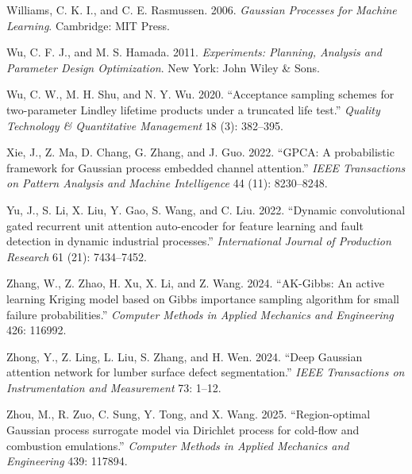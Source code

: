 \documentclass[]{interact}
\theoremstyle{plain}%
\theoremstyle{definition}
\theoremstyle{remark}
\begin{document}
\begin{thebibliography}{}
Williams, C. K. I., and C. E. Rasmussen. 2006. \emph{Gaussian Processes for Machine Learning}. Cambridge: MIT Press.

Wu, C. F. J., and M. S. Hamada. 2011. \emph{Experiments: Planning, Analysis and Parameter Design Optimization}. New York: John Wiley \& Sons.

Wu, C. W., M. H. Shu, and N. Y. Wu. 2020. ``Acceptance sampling schemes for two-parameter Lindley lifetime products under a truncated life test.'' \emph{Quality Technology \& Quantitative Management} 18 (3): 382--395.



Xie, J., Z. Ma, D. Chang, G. Zhang, and J. Guo. 2022. ``GPCA: A probabilistic framework for Gaussian process embedded channel attention.'' \emph{IEEE Transactions on Pattern Analysis and Machine Intelligence} 44 (11): 8230--8248.


Yu, J., S. Li, X. Liu, Y. Gao, S. Wang, and C. Liu. 2022. ``Dynamic convolutional gated recurrent unit attention auto-encoder for feature learning and fault detection in dynamic industrial processes.'' \emph{International Journal of Production Research} 61 (21): 7434--7452.

Zhang, W., Z. Zhao, H. Xu, X. Li, and Z. Wang. 2024. ``AK-Gibbs: An active learning Kriging model based on Gibbs importance sampling algorithm for small failure probabilities.'' \emph{Computer Methods in Applied Mechanics and Engineering} 426: 116992.

Zhong, Y., Z. Ling, L. Liu, S. Zhang, and H. Wen. 2024. ``Deep Gaussian attention network for lumber surface defect segmentation.'' \emph{IEEE Transactions on Instrumentation and Measurement} 73: 1--12.

Zhou, M., R. Zuo, C. Sung, Y. Tong, and X. Wang. 2025. ``Region-optimal Gaussian process surrogate model via Dirichlet process for cold-flow and combustion emulations.'' \emph{Computer Methods in Applied Mechanics and Engineering} 439: 117894.

\end{thebibliography}
\end{document}
